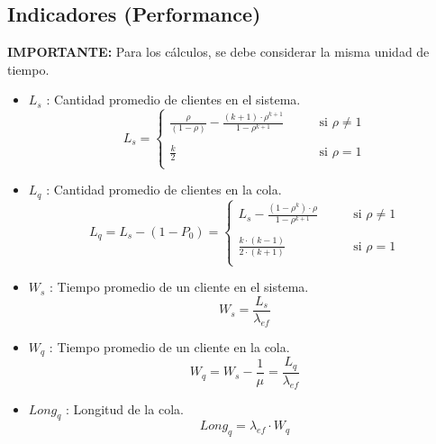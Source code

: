 \documentclass{templateNote}
\begin{document}
\newpage
\subsection{Indicadores (Performance)}
\textbf{IMPORTANTE:} Para los cálculos, se debe considerar la misma unidad de tiempo.
\begin{itemize}
    \item $L_s$ : Cantidad promedio de clientes en el sistema.
    \begin{equation*}
        L_s = \begin{cases}
            \displaystyle\frac{\rho}{(1 - \rho)} - \frac{(k + 1)\cdot \rho^{k+1}}{1 - \rho^{k+1}} & \qquad \text{si } \rho \neq 1 \\
            \\
            \displaystyle\frac{k}{2} & \qquad \text{si } \rho = 1 \\
        \end{cases}
    \end{equation*}

    \item $L_q$ : Cantidad promedio de clientes en la cola.
    \begin{equation*}
        L_q = L_s - (1 - P_0) = \begin{cases}
            \displaystyle L_s - \frac{(1 - \rho^k) \cdot \rho}{1 - \rho^{k + 1}} & \qquad \text{si } \rho \neq 1 \\
            \\
            \displaystyle \frac{k \cdot (k - 1)}{2 \cdot (k + 1)} & \qquad \text{si } \rho = 1 \\
        \end{cases}
    \end{equation*}

    \item $W_s$ : Tiempo promedio de un cliente en el sistema.
    \begin{equation*}
        W_s = \frac{L_s}{\lambda_{ef}}
    \end{equation*}

    \item $W_q$ : Tiempo promedio de un cliente en la cola.
    \begin{equation*}
        W_q = W_s - \frac{1}{\mu} = \frac{L_q}{\lambda_{ef}}
    \end{equation*}


    \item $Long_q$ : Longitud de la cola.
    \begin{equation*}
        Long_q = \lambda_{ef} \cdot W_q
    \end{equation*}
\end{itemize}
\end{document}
